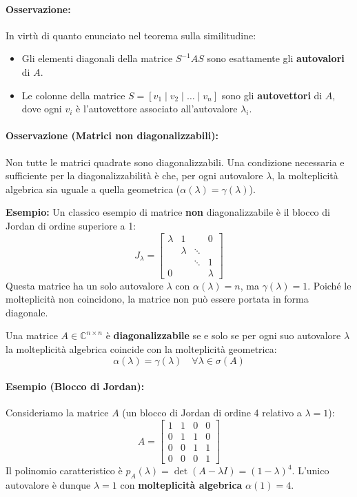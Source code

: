 \documentclass[a4paper,12pt]{article}
\begin{document}
	\paragraph{Osservazione:} 
	In virtù di quanto enunciato nel teorema sulla similitudine:
	\begin{itemize}
		\item Gli elementi diagonali della matrice $S^{-1}AS$ sono esattamente gli \textbf{autovalori} di $A$.
		\item Le colonne della matrice $S = [v_1 \mid v_2 \mid \dots \mid v_n]$ sono gli \textbf{autovettori} di $A$, dove ogni $v_i$ è l'autovettore associato all'autovalore $\lambda_i$.
	\end{itemize}
	
	\paragraph{Osservazione (Matrici non diagonalizzabili):} 
	Non tutte le matrici quadrate sono diagonalizzabili. Una condizione necessaria e sufficiente per la diagonalizzabilità è che, per ogni autovalore $\lambda$, la molteplicità algebrica sia uguale a quella geometrica ($\alpha(\lambda) = \gamma(\lambda)$).
	
	\medskip
	\noindent \textbf{Esempio:} Un classico esempio di matrice \textbf{non} diagonalizzabile è il blocco di Jordan di ordine superiore a 1:
	\[
	J_\lambda = \begin{bmatrix} 
		\lambda & 1 & & 0 \\
		& \lambda & \ddots & \\
		& & \ddots & 1 \\
		0 & & & \lambda 
	\end{bmatrix}
	\]
	Questa matrice ha un solo autovalore $\lambda$ con $\alpha(\lambda) = n$, ma $\gamma(\lambda) = 1$. Poiché le molteplicità non coincidono, la matrice non può essere portata in forma diagonale.
	\begin{tcolorbox}[title=Teorema: Condizione Necessaria e Sufficiente]
		Una matrice $A \in \mathbb{C}^{n \times n}$ è \textbf{diagonalizzabile} se e solo se per ogni suo autovalore $\lambda$ la molteplicità algebrica coincide con la molteplicità geometrica:
		\begin{equation}
			\alpha(\lambda) = \gamma(\lambda) \quad \forall \lambda \in \sigma(A)
		\end{equation}
	\end{tcolorbox}
	
	\paragraph{Esempio (Blocco di Jordan):} 
	Consideriamo la matrice $A$ (un blocco di Jordan di ordine 4 relativo a $\lambda=1$):
	\[
	A = \begin{bmatrix} 
		1 & 1 & 0 & 0 \\ 
		0 & 1 & 1 & 0 \\ 
		0 & 0 & 1 & 1 \\ 
		0 & 0 & 0 & 1 
	\end{bmatrix}
	\]
	Il polinomio caratteristico è $p_A(\lambda) = \det(A - \lambda I) = (1 - \lambda)^4$. 
	L'unico autovalore è dunque $\lambda = 1$ con \textbf{molteplicità algebrica} $\alpha(1) = 4$.
	
\end{document}

